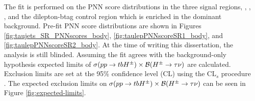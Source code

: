 		The fit is performed on the \gls{PNN} score distributions in the three signal regions, \taujets, \tauel, \taumu, and the dilepton-btag control region which is enriched in the dominant \ttbar background. Pre-fit \gls{PNN} score distributions are shown in Figures \ref{fig:taujets_SR_PNNscores_body}, \ref{fig:taulepPNNscoreSR1_body}, and \ref{fig:taulepPNNscoreSR2_body}. At the time of writing this dissertation, the analysis is still blinded. Assuming the fit agrees with the background-only hypothesis expected limits of $\sigma(pp \to tbH^{\pm})\times \mathrm{\cal{B}}(H^{\pm} \to \tau \nu)$ are calculated. Exclusion limits are set at the 95\% confidence level (CL) using the $\mathrm{CL}_s$ procedure \cite{CL-setting}. The expected exclusion limits on $\sigma(pp \to tbH^{\pm})\times \mathrm{\cal{B}}(H^{\pm} \to \tau \nu)$ can be seen in Figure \ref{fig:expected-limits}.

